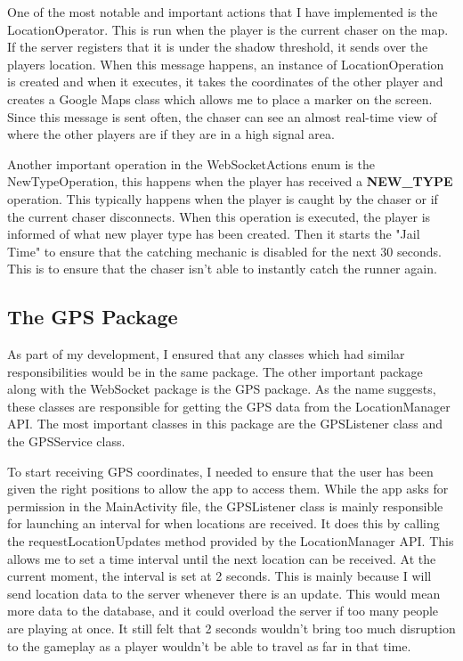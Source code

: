 \documentclass{l4proj}
\begin{document}
One of the most notable and important actions that I have implemented is the LocationOperator. This is run when the player
is the current chaser on the map. If the server registers that it is under the shadow threshold, it sends over the
players location. When this message happens, an instance of LocationOperation is created and when it executes, it
takes the coordinates of the other player and creates a Google Maps class which allows me to place a marker on the
screen. Since this message is sent often, the chaser can see an almost real-time view of where the other players
are if they are in a high signal area.

Another important operation in the WebSocketActions enum is the NewTypeOperation, this happens when the player has received
a \textbf{NEW\_TYPE} operation. This typically happens when the player is caught by the chaser or if the current chaser disconnects.
When this operation is executed, the player is informed of what new player type has been created. Then it starts the "Jail Time" to ensure that the catching mechanic is disabled for the next 30 seconds. This is to ensure that the
chaser isn't able to instantly catch the runner again.



\subsection{The GPS Package}
As part of my development, I ensured that any classes which had similar responsibilities would be in the same
package. The other important package along with the WebSocket package is the GPS package. As the name suggests,
these classes are responsible for getting the GPS data from the LocationManager API. The most important classes
in this package are the GPSListener class and the GPSService class.

To start receiving GPS coordinates, I needed to ensure that the user has been given the right positions to
allow the app to access them. While the app asks for permission in the MainActivity file, the GPSListener class
is mainly responsible for launching an interval for when locations are received. It does this by calling the
requestLocationUpdates method provided by the LocationManager API. This allows me to set a time interval until
the next location can be received. At the current moment, the interval is set at 2 seconds. This is mainly because
I will send location data to the server whenever there is an update. This would mean more data to the database, and
it could overload the server if too many people are playing at once. It still felt that 2 seconds wouldn't bring
too much disruption to the gameplay as a player wouldn't be able to travel as far in that time.
\end{document}
